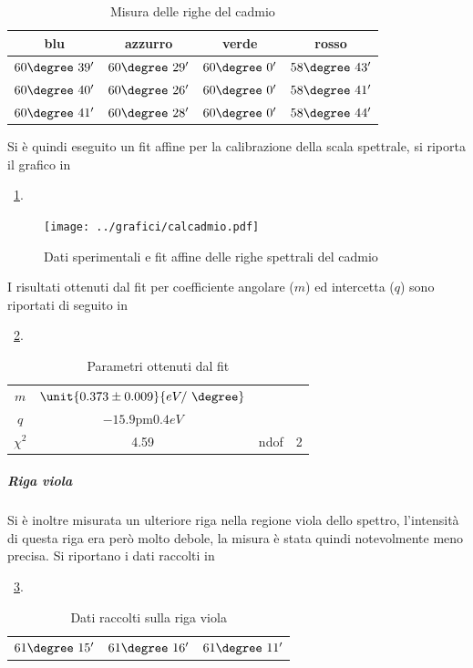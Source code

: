 \documentclass[a4paper,10pt]{article}
\begin{document}
\begin{table}[H]
	\centering
	\begin{tabular}{c|c|c|c}
	blu & azzurro & verde & rosso \\
	\hline
	$60\degree~39'$ & $60\degree~29'$ & $60\degree~0'$ & $58\degree~43'$\\
	$60\degree~40'$ & $60\degree~26'$ & $60\degree~0'$ & $58\degree~41'$\\
	$60\degree~41'$ & $60\degree~28'$ & $60\degree~0'$ & $58\degree~44'$\\
	\end{tabular}
	\caption{Misura delle righe del cadmio}
	\label{tab:cadmio}
\end{table}

Si è quindi eseguito un fit affine per la calibrazione della scala spettrale, si riporta il grafico in \figurename{~\ref{fig:cadmio}.

\begin{figure}[H]
	\centering
	\texttt{[image: ../grafici/calcadmio.pdf]}
	\caption{Dati sperimentali e fit affine delle righe spettrali del cadmio}
	\label{fig:cadmio}
\end{figure}

I risultati ottenuti dal fit per coefficiente angolare ($m$) ed intercetta ($q$) sono riportati di seguito in \tablename{~\ref{tab:calcadmio}.
	

\begin{table}[H]
	\centering
	\begin{tabular}{|c|c|c|c|}
		\cline{0-1}		
		$m$ & $\unit{0.373 \pm 0.009}{eV/~\degree}$ \\
		\cline{0-1}
		$q$ & $\unit{-15.9 \pm 0.4}{eV}$ \\
		\hline
		$\chi^2$ & 4.59& ndof & 2\\
		\hline
	\end{tabular}
	\caption{Parametri ottenuti dal fit}
	\label{tab:calcadmio}
\end{table}

\subparagraph{Riga viola} Si è inoltre misurata un ulteriore riga nella regione viola dello spettro, l'intensità di questa riga era però molto debole, la misura è stata quindi notevolmente meno precisa.
Si riportano i dati raccolti in \tablename{~\ref{tab:viola}.
	
\begin{table}[H]
	\centering
	\begin{tabular}{c|c|c}
		$61\degree~15'$  & $61\degree~16'$ & $61\degree~11'$\\
	\end{tabular}
	\caption{Dati raccolti sulla riga viola}
	\label{tab:viola}
\end{table}
	
}}}
\end{document}
